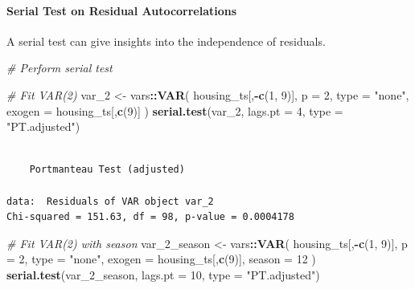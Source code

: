 \documentclass[
]{article}
\newenvironment{Shaded}{\begin{snugshade}}{\end{snugshade}}
\newcommand{\AttributeTok}[1]{\textcolor[rgb]{0.13,0.29,0.53}{#1}}
\newcommand{\CommentTok}[1]{\textcolor[rgb]{0.56,0.35,0.01}{\textit{#1}}}
\newcommand{\DecValTok}[1]{\textcolor[rgb]{0.00,0.00,0.81}{#1}}
\newcommand{\FunctionTok}[1]{\textcolor[rgb]{0.13,0.29,0.53}{\textbf{#1}}}
\newcommand{\NormalTok}[1]{#1}
\newcommand{\OtherTok}[1]{\textcolor[rgb]{0.56,0.35,0.01}{#1}}
\newcommand{\SpecialCharTok}[1]{\textcolor[rgb]{0.81,0.36,0.00}{\textbf{#1}}}
\newcommand{\StringTok}[1]{\textcolor[rgb]{0.31,0.60,0.02}{#1}}
\begin{document}
\hypertarget{serial-test-on-residual-autocorrelations}{%
\paragraph{Serial Test on Residual
Autocorrelations}\label{serial-test-on-residual-autocorrelations}}

A serial test can give insights into the independence of residuals.

\begin{Shaded}
\begin{Highlighting}[]
\CommentTok{\# Perform serial test}

\CommentTok{\# Fit VAR(2)}
\NormalTok{var\_2 }\OtherTok{\textless{}{-}}\NormalTok{ vars}\SpecialCharTok{::}\FunctionTok{VAR}\NormalTok{(}
\NormalTok{  housing\_ts[,}\SpecialCharTok{{-}}\FunctionTok{c}\NormalTok{(}\DecValTok{1}\NormalTok{, }\DecValTok{9}\NormalTok{)], }\AttributeTok{p =} \DecValTok{2}\NormalTok{, }\AttributeTok{type =} \StringTok{"none"}\NormalTok{, }
  \AttributeTok{exogen =}\NormalTok{ housing\_ts[,}\FunctionTok{c}\NormalTok{(}\DecValTok{9}\NormalTok{)]}
\NormalTok{)}
\FunctionTok{serial.test}\NormalTok{(var\_2, }\AttributeTok{lags.pt =} \DecValTok{4}\NormalTok{, }\AttributeTok{type =} \StringTok{"PT.adjusted"}\NormalTok{)}
\end{Highlighting}
\end{Shaded}

\begin{verbatim}

    Portmanteau Test (adjusted)

data:  Residuals of VAR object var_2
Chi-squared = 151.63, df = 98, p-value = 0.0004178
\end{verbatim}

\begin{Shaded}
\begin{Highlighting}[]
\CommentTok{\# Fit VAR(2) with season}
\NormalTok{var\_2\_season }\OtherTok{\textless{}{-}}\NormalTok{ vars}\SpecialCharTok{::}\FunctionTok{VAR}\NormalTok{(}
\NormalTok{  housing\_ts[,}\SpecialCharTok{{-}}\FunctionTok{c}\NormalTok{(}\DecValTok{1}\NormalTok{, }\DecValTok{9}\NormalTok{)], }\AttributeTok{p =} \DecValTok{2}\NormalTok{, }\AttributeTok{type =} \StringTok{"none"}\NormalTok{, }
  \AttributeTok{exogen =}\NormalTok{ housing\_ts[,}\FunctionTok{c}\NormalTok{(}\DecValTok{9}\NormalTok{)], }\AttributeTok{season =} \DecValTok{12}
\NormalTok{)}
\FunctionTok{serial.test}\NormalTok{(var\_2\_season, }\AttributeTok{lags.pt =} \DecValTok{10}\NormalTok{, }\AttributeTok{type =} \StringTok{"PT.adjusted"}\NormalTok{)}
\end{Highlighting}
\end{Shaded}
\end{document}
